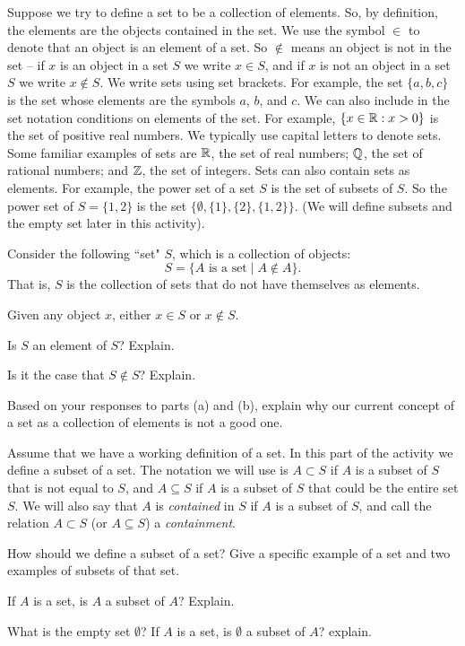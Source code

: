 \begin{pa} \label{pa:sets} Suppose we try to define a set to be a collection of elements. So, by definition, the elements are the objects contained in the set. We use the symbol $\in$ to denote that an object is an element of a set. So $\notin$ means an object is not in the set -- if $x$ is an object in a set $S$ we write $x \in S$, and if $x$ is not an object in a set $S$ we write $x \notin S$. We write sets using set brackets. For example, the set $\{a,b,c\}$ is the set whose elements are the symbols $a$, $b$, and $c$. We can also include in the set notation conditions on elements of the set. For example, $\{x \in \mathbb{R} : x > 0\}$ is the set of positive real numbers. We typically use capital letters to denote sets. Some familiar examples of sets are $\mathbb{R}$, the set of real numbers; $\mathbb{Q}$, the set of rational numbers; and $\mathbb{Z}$, the set of integers. Sets can also contain sets as elements. For example, the power set of a set  $S$ is the set of subsets of $S$. So the power set of $S = \{1,2\}$ is the set $\{\emptyset, \{1\}, \{2\}, \{1,2\}\}$. (We will define subsets and the empty set later in this activity).   

\be
\item Consider the following ``set" $S$, which is a collection of objects:
	\[S = \{A \text{ is a set} \mid A \notin A\}.\]
	That is, $S$ is the collection of sets that do not have themselves as elements. 

Given any object $x$, either $x \in S$ or $x \notin S$. 
	\ba
	\item Is $S$ an element of $S$? Explain.

	\item Is it the case that $S \notin S$? Explain. 
	
	\item Based on your responses to parts (a) and (b), explain why our current concept of a set as a collection of elements is not a good one.  

	\ea

\item Assume that we have a working definition of a set. In this part of the activity we define a subset of a set. The notation we will use is $A \subset S$ if $A$ is a subset of $S$ that is not equal to $S$, and $A \subseteq S$ if $A$ is a subset of $S$ that could be the entire set $S$. We will also say that $A$ is \emph{contained} in $S$ if $A$ is a subset of $S$, and call the relation $A \subset S$ (or $A \subseteq S$) a \emph{containment}.

	\ba
	\item How should we define a subset of a set? Give a specific example of a set and two examples of subsets of that set.
	
	\item If $A$ is a set, is $A$ a subset of $A$? Explain.

	\item What is the empty set $\emptyset$? If $A$ is a set, is $\emptyset$ a subset of $A$? explain.

	\ea

\ee

\end{pa}

